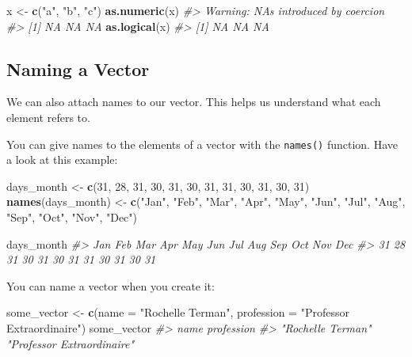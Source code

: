 \documentclass[
]{book}
\newenvironment{Shaded}{\begin{snugshade}}{\end{snugshade}}
\newcommand{\CommentTok}[1]{\textcolor[rgb]{0.56,0.35,0.01}{\textit{#1}}}
\newcommand{\DataTypeTok}[1]{\textcolor[rgb]{0.13,0.29,0.53}{#1}}
\newcommand{\DecValTok}[1]{\textcolor[rgb]{0.00,0.00,0.81}{#1}}
\newcommand{\KeywordTok}[1]{\textcolor[rgb]{0.13,0.29,0.53}{\textbf{#1}}}
\newcommand{\NormalTok}[1]{#1}
\newcommand{\StringTok}[1]{\textcolor[rgb]{0.31,0.60,0.02}{#1}}
\begin{document}
\begin{Shaded}
\begin{Highlighting}[]
\NormalTok{x <-}\StringTok{ }\KeywordTok{c}\NormalTok{(}\StringTok{"a"}\NormalTok{, }\StringTok{"b"}\NormalTok{, }\StringTok{"c"}\NormalTok{)}
\KeywordTok{as.numeric}\NormalTok{(x)}
\CommentTok{#> Warning: NAs introduced by coercion}
\CommentTok{#> [1] NA NA NA}
\KeywordTok{as.logical}\NormalTok{(x)}
\CommentTok{#> [1] NA NA NA}
\end{Highlighting}
\end{Shaded}

\hypertarget{naming-a-vector}{%
\subsection{Naming a Vector}\label{naming-a-vector}}

We can also attach names to our vector. This helps us understand what each element refers to.

You can give names to the elements of a vector with the \texttt{names()} function. Have a look at this example:

\begin{Shaded}
\begin{Highlighting}[]
\NormalTok{days_month <-}\StringTok{ }\KeywordTok{c}\NormalTok{(}\DecValTok{31}\NormalTok{, }\DecValTok{28}\NormalTok{, }\DecValTok{31}\NormalTok{, }\DecValTok{30}\NormalTok{, }\DecValTok{31}\NormalTok{, }\DecValTok{30}\NormalTok{, }\DecValTok{31}\NormalTok{, }\DecValTok{31}\NormalTok{, }\DecValTok{30}\NormalTok{, }\DecValTok{31}\NormalTok{, }\DecValTok{30}\NormalTok{, }\DecValTok{31}\NormalTok{)}
\KeywordTok{names}\NormalTok{(days_month) <-}\StringTok{ }\KeywordTok{c}\NormalTok{(}\StringTok{"Jan"}\NormalTok{, }\StringTok{"Feb"}\NormalTok{, }\StringTok{"Mar"}\NormalTok{, }\StringTok{"Apr"}\NormalTok{, }\StringTok{"May"}\NormalTok{, }\StringTok{"Jun"}\NormalTok{, }\StringTok{"Jul"}\NormalTok{, }\StringTok{"Aug"}\NormalTok{, }\StringTok{"Sep"}\NormalTok{, }\StringTok{"Oct"}\NormalTok{, }\StringTok{"Nov"}\NormalTok{, }\StringTok{"Dec"}\NormalTok{)}

\NormalTok{days_month}
\CommentTok{#> Jan Feb Mar Apr May Jun Jul Aug Sep Oct Nov Dec }
\CommentTok{#>  31  28  31  30  31  30  31  31  30  31  30  31}
\end{Highlighting}
\end{Shaded}

You can name a vector when you create it:

\begin{Shaded}
\begin{Highlighting}[]
\NormalTok{some_vector <-}\StringTok{ }\KeywordTok{c}\NormalTok{(}\DataTypeTok{name =} \StringTok{"Rochelle Terman"}\NormalTok{, }\DataTypeTok{profession =} \StringTok{"Professor Extraordinaire"}\NormalTok{)}
\NormalTok{some_vector}
\CommentTok{#>                       name                 profession }
\CommentTok{#>          "Rochelle Terman" "Professor Extraordinaire"}
\end{Highlighting}
\end{Shaded}
\end{document}
